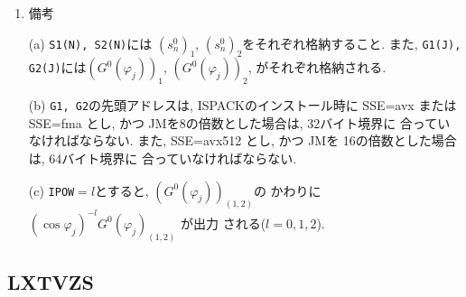 \documentclass[a4j]{jarticle}
\begin{document}
\begin{enumerate}
\item 備考

  (a) \texttt{S1(N), S2(N)}には
  $(s^0_n)_1$, $(s^0_n)_2$をそれぞれ格納すること.
  また, \texttt{G1(J), G2(J)}には$(G^0(\varphi_j))_1$,
  $(G^0(\varphi_j))_2$,
  がそれぞれ格納される.

(b) \texttt{G1, G2}の先頭アドレスは, 
ISPACKのインストール時に SSE=avx または SSE=fma とし, かつ
JMを8の倍数とした場合は, 32バイト境界に
合っていなければならない.
また, SSE=avx512 とし, かつ
JMを 16の倍数とした場合は, 64バイト境界に
合っていなければならない.

(c) \texttt{IPOW}$=l$とすると, $(G^0(\varphi_j))_{(1,2)}$の
    かわりに $(\cos\varphi_j)^{-l}G^0(\varphi_j)_{(1,2)}$ が出力
    される($l=0,1,2$).

\end{enumerate}


\subsection{LXTVZS}
\end{document}
